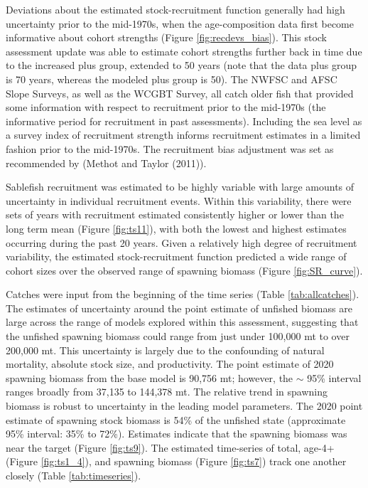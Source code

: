 \documentclass[11pt,
  english,
  a4paper,
]{article}
\begin{document}
Deviations about the estimated stock-recruitment function generally had high uncertainty prior to the mid-1970s, when the age-composition data first become informative about cohort strengths (Figure \ref{fig:recdevs_bias}). This stock assessment update was able to estimate cohort strengths further back in time due to the increased plus group, extended to 50 years (note that the data plus group is 70 years, whereas the modeled plus group is 50). The NWFSC and AFSC Slope Surveys, as well as the WCGBT Survey, all catch older fish that provided some information with respect to recruitment prior to the mid-1970s (the informative period for recruitment in past assessments). Including the sea level as a survey index of recruitment strength informs recruitment estimates in a limited fashion prior to the mid-1970s. The recruitment bias adjustment was set as recommended by ({Methot and Taylor (2011)\leavevmode\tagmcend\tagstructend}).

\leavevmode\tagmcend\tagstructend\par


Sablefish recruitment was estimated to be highly variable with large amounts of uncertainty in individual recruitment events. Within this variability, there were sets of years with recruitment estimated consistently higher or lower than the long term mean (Figure \ref{fig:ts11}), with both the lowest and highest estimates occurring during the past 20 years. Given a relatively high degree of recruitment variability, the estimated stock-recruitment function predicted a wide range of cohort sizes over the observed range of spawning biomass (Figure \ref{fig:SR_curve}).

\leavevmode\tagmcend\tagstructend\par


Catches were input from the beginning of the time series (Table \ref{tab:allcatches}). The estimates of uncertainty around the point estimate of unfished biomass are large across the range of models explored within this assessment, suggesting that the unfished spawning biomass could range from just under 100,000 mt to over 200,000 mt. This uncertainty is largely due to the confounding of natural mortality, absolute stock size, and productivity. The point estimate of 2020 spawning biomass from the base model is 90,756 mt; however, the {\(\sim\)\leavevmode\tagmcend\tagstructend} 95\% interval ranges broadly from 37,135 to 144,378 mt. The relative trend in spawning biomass is robust to uncertainty in the leading model parameters. The 2020 point estimate of spawning stock biomass is 54\% of the unfished state (approximate 95\% interval: 35\% to 72\%). Estimates indicate that the spawning biomass was near the target (Figure \ref{fig:ts9}). The estimated time-series of total, age-4+ (Figure \ref{fig:ts1_4}), and spawning biomass (Figure \ref{fig:ts7}) track one another closely (Table \ref{tab:timeseries}).
\end{document}
